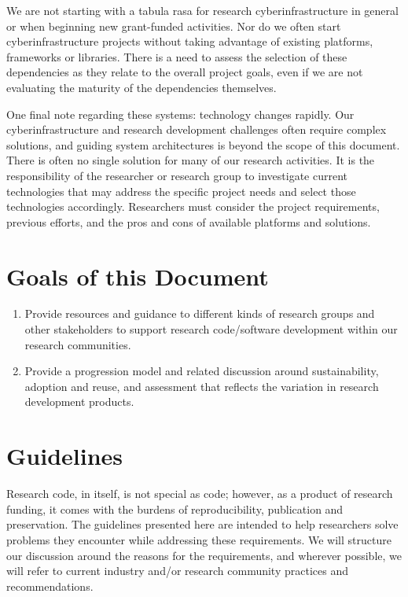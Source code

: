 \documentclass{article}
\begin{document}
We are not starting with a tabula rasa for research cyberinfrastructure in general or when beginning new grant-funded activities. Nor do we often start cyberinfrastructure projects without taking advantage of existing platforms, frameworks or libraries. There is a need to assess the selection of these dependencies as they relate to the overall project goals, even if we are not evaluating the maturity of the dependencies themselves.
 
One final note regarding these systems: technology changes rapidly. Our cyberinfrastructure and research development challenges often require complex solutions, and guiding system architectures is beyond the scope of this document. There is often no single solution for many of our research activities. It is the responsibility of the researcher or research group to investigate current technologies that may address the specific project needs and select those technologies accordingly. Researchers must consider the project requirements, previous efforts, and the pros and cons of available platforms and solutions. 

\section{Goals of this Document}
\begin{enumerate}
\item Provide resources and guidance to different kinds of research groups and other stakeholders to support research code/software development within our research communities.
\item Provide a progression model and related discussion around sustainability, adoption and reuse, and assessment that reflects the variation in research development products. 
\end{enumerate}


\section{Guidelines}
Research code, in itself, is not special as code; however, as a product of research funding, it comes with the burdens of reproducibility, publication and preservation. The guidelines presented here are intended to help researchers solve problems they encounter while addressing these requirements. We will structure our discussion around the reasons for the requirements, and wherever possible, we will refer to current industry and/or research community practices and recommendations. 
 
\end{document}
